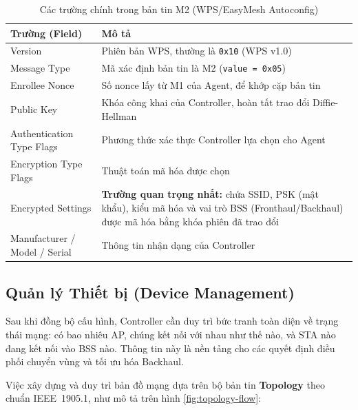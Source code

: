 \begin{table}[ht]
	\centering
	\caption{Các trường chính trong bản tin M2 (WPS/EasyMesh Autoconfig)}
	\begin{tabular}{|>{\raggedright\arraybackslash}m{4cm}|>{\raggedright\arraybackslash}m{9cm}|}
		\hline
		\textbf{Trường (Field)} & \textbf{Mô tả} \\
		\hline
		Version & Phiên bản WPS, thường là \texttt{0x10} (WPS v1.0) \\
		\hline
		Message Type & Mã xác định bản tin là M2 (\texttt{value = 0x05}) \\
		\hline
		Enrollee Nonce & Số nonce lấy từ M1 của Agent, để khớp cặp bản tin \\
		\hline
		Public Key & Khóa công khai của Controller, hoàn tất trao đổi Diffie-Hellman \\
		\hline
		Authentication Type Flags & Phương thức xác thực Controller lựa chọn cho Agent \\
		\hline
		Encryption Type Flags & Thuật toán mã hóa được chọn \\
		\hline
		Encrypted Settings & \textbf{Trường quan trọng nhất:} chứa SSID, PSK (mật khẩu), kiểu mã hóa và vai trò BSS (Fronthaul/Backhaul) được mã hóa bằng khóa phiên đã trao đổi \\
		\hline
		Manufacturer / Model / Serial & Thông tin nhận dạng của Controller \\
		\hline
	\end{tabular}
\end{table}


\subsection{Quản lý Thiết bị (Device Management)}

Sau khi đồng bộ cấu hình, Controller cần duy trì bức tranh toàn diện về trạng thái
mạng: có bao nhiêu AP, chúng kết nối với nhau như thế nào, và STA nào đang kết nối
vào BSS nào. Thông tin này là nền tảng cho các quyết định điều phối chuyển vùng và
tối ưu hóa Backhaul.

Việc xây dựng và duy trì bản đồ mạng dựa trên bộ bản tin \textbf{Topology} theo
chuẩn IEEE~1905.1, như mô tả trên hình \ref{fig:topology-flow}:

